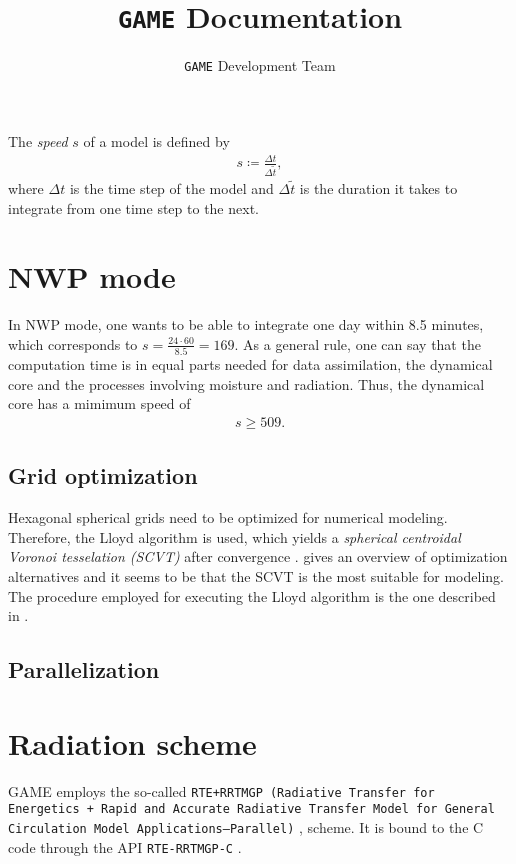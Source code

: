 \documentclass{article}
\title{\texttt{GAME} Documentation}
\author{\texttt{GAME} Development Team}
\date{}
\begin{document}
\maketitle

The \textit{speed} $s$ of a model is defined by
%
\begin{eqnarray}
s \coloneqq \frac{\Delta t}{\Delta\tilde{t}},
\end{eqnarray}
%
where $\Delta t$ is the time step of the model and $\Delta\tilde{t}$ is the duration it takes to integrate from one time step to the next.

\section{NWP mode}
\label{sec:nwp_mode}

In NWP mode, one wants to be able to integrate one day within 8.5 minutes, which corresponds to $s = \frac{24\cdot 60}{8.5} = 169$. As a general rule, one can say that the computation time is in equal parts needed for data assimilation, the dynamical core and the processes involving moisture and radiation. Thus, the dynamical core has a mimimum speed of
%
\begin{eqnarray}
s \geq 509.
\end{eqnarray}

\subsection{Grid optimization}
\label{sec:grid_optimization}

Hexagonal spherical grids need to be optimized for numerical modeling. Therefore, the Lloyd algorithm is used, which yields a \textit{spherical centroidal Voronoi tesselation (SCVT)} after convergence \cite{Du2003}. \cite{PEIXOTO201361} gives an overview of optimization alternatives and it seems to be that the SCVT is the most suitable for modeling. The procedure employed for executing the Lloyd algorithm is the one described in \cite{10.1175/MWR2991.1}.

\subsection{Parallelization}
\label{sec:parallelization}

\section{Radiation scheme}
\label{sec:radiation_scheme}

GAME employs the so-called \texttt{RTE+RRTMGP (Radiative Transfer for Energetics + Rapid and Accurate Radiative Transfer Model for General Circulation Model Applications—Parallel)} \cite{doi:10.1029/2019MS001621}, \cite{rte-rrtmgp-github} scheme. It is bound to the C code through the API \texttt{RTE-RRTMGP-C} \cite{rte-rrtmgp-c-github}.

\appendix

\printbibliography
\end{document}
